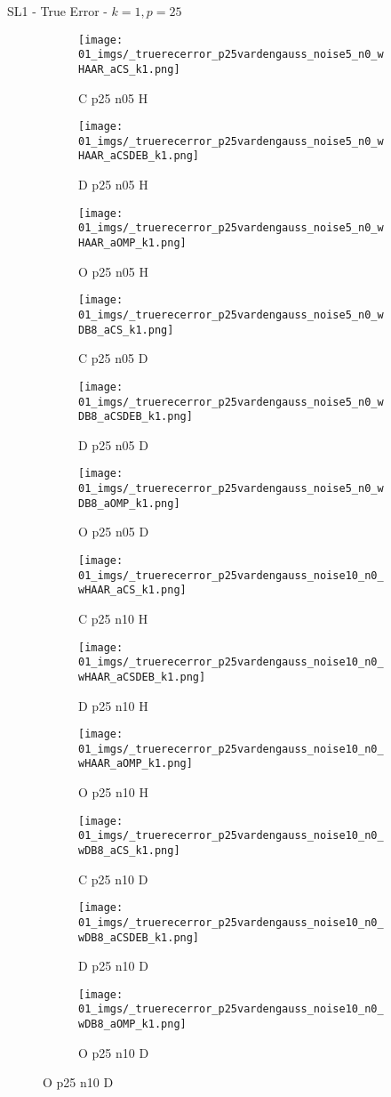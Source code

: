 \begin{frame}{SL1 - True Error - $k=1,p=25$}{}
\begin{figure}
\begin{subfigure}{0.13\textwidth}
\texttt{[image: 01\_imgs/\_truerecerror\_p25vardengauss\_noise5\_n0\_wHAAR\_aCS\_k1.png]}
\caption*{\tiny C p25 n05 H}
\end{subfigure}
\begin{subfigure}{0.13\textwidth}
\texttt{[image: 01\_imgs/\_truerecerror\_p25vardengauss\_noise5\_n0\_wHAAR\_aCSDEB\_k1.png]}
\caption*{\tiny D p25 n05 H}
\end{subfigure}
\begin{subfigure}{0.13\textwidth}
\texttt{[image: 01\_imgs/\_truerecerror\_p25vardengauss\_noise5\_n0\_wHAAR\_aOMP\_k1.png]}
\caption*{\tiny O p25 n05 H}
\end{subfigure}
\begin{subfigure}{0.13\textwidth}
\texttt{[image: 01\_imgs/\_truerecerror\_p25vardengauss\_noise5\_n0\_wDB8\_aCS\_k1.png]}
\caption*{\tiny C p25 n05 D}
\end{subfigure}
\begin{subfigure}{0.13\textwidth}
\texttt{[image: 01\_imgs/\_truerecerror\_p25vardengauss\_noise5\_n0\_wDB8\_aCSDEB\_k1.png]}
\caption*{\tiny D p25 n05 D}
\end{subfigure}
\begin{subfigure}{0.13\textwidth}
\texttt{[image: 01\_imgs/\_truerecerror\_p25vardengauss\_noise5\_n0\_wDB8\_aOMP\_k1.png]}
\caption*{\tiny O p25 n05 D}
\end{subfigure}

\vspace{5pt}

\begin{subfigure}{0.13\textwidth}
\texttt{[image: 01\_imgs/\_truerecerror\_p25vardengauss\_noise10\_n0\_wHAAR\_aCS\_k1.png]}
\caption*{\tiny C p25 n10 H}
\end{subfigure}
\begin{subfigure}{0.13\textwidth}
\texttt{[image: 01\_imgs/\_truerecerror\_p25vardengauss\_noise10\_n0\_wHAAR\_aCSDEB\_k1.png]}
\caption*{\tiny D p25 n10 H}
\end{subfigure}
\begin{subfigure}{0.13\textwidth}
\texttt{[image: 01\_imgs/\_truerecerror\_p25vardengauss\_noise10\_n0\_wHAAR\_aOMP\_k1.png]}
\caption*{\tiny O p25 n10 H}
\end{subfigure}
\begin{subfigure}{0.13\textwidth}
\texttt{[image: 01\_imgs/\_truerecerror\_p25vardengauss\_noise10\_n0\_wDB8\_aCS\_k1.png]}
\caption*{\tiny C p25 n10 D}
\end{subfigure}
\begin{subfigure}{0.13\textwidth}
\texttt{[image: 01\_imgs/\_truerecerror\_p25vardengauss\_noise10\_n0\_wDB8\_aCSDEB\_k1.png]}
\caption*{\tiny D p25 n10 D}
\end{subfigure}
\begin{subfigure}{0.13\textwidth}
\texttt{[image: 01\_imgs/\_truerecerror\_p25vardengauss\_noise10\_n0\_wDB8\_aOMP\_k1.png]}
\caption*{\tiny O p25 n10 D}
\end{subfigure}


\end{figure}
\end{frame}
